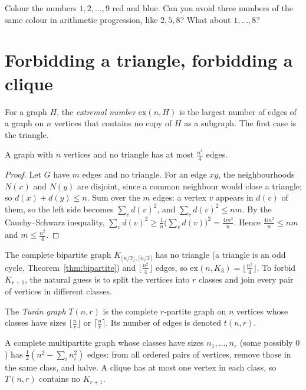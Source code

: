 \begin{think}
Colour the numbers $1,2,\dots,9$ red and blue. Can you avoid three numbers of the same colour in arithmetic progression, like $2,5,8$?
What about $1,\dots,8$?
\end{think}

\section{Forbidding a triangle, forbidding a clique}

For a graph $H$, the \emph{extremal number} $\mathrm{ex}(n,H)$ is the largest number of edges of a graph on $n$ vertices that contains no
copy of $H$ as a subgraph. The first case is the triangle.

\begin{theorem}[Mantel, 1907]\label{thm:mantel}
A graph with $n$ vertices and no triangle has at most $\frac{n^2}4$ edges.
\end{theorem}
\begin{proof}
Let $G$ have $m$ edges and no triangle. For an edge $xy$, the neighbourhoods $N(x)$ and $N(y)$ are disjoint, since a common neighbour would close a
triangle; so $d(x)+d(y)\le n$. Sum over the $m$ edges: a vertex $v$ appears in $d(v)$ of them, so the left side becomes $\sum_vd(v)^2$, and
$\sum_vd(v)^2\le nm$. By the Cauchy--Schwarz inequality, $\sum_vd(v)^2\ge\frac1n\bigl(\sum_vd(v)\bigr)^2=\frac{4m^2}n$. Hence $\frac{4m^2}n\le nm$ and
$m\le\frac{n^2}4$.
\end{proof}

The complete bipartite graph $K_{\lfloor n/2\rfloor,\lceil n/2\rceil}$ has no triangle (a triangle is an odd cycle, Theorem~\ref{thm:bipartite}) and
$\lfloor\frac{n^2}4\rfloor$ edges, so $\mathrm{ex}(n,K_3)=\lfloor\frac{n^2}4\rfloor$. To forbid $K_{r+1}$, the natural guess is to split the vertices into $r$
classes and join every pair of vertices in different classes.

\begin{definition}\label{def:turan}
The \emph{Tur\'an graph} $T(n,r)$ is the complete $r$-partite graph on $n$ vertices whose classes have sizes $\lfloor\frac nr\rfloor$ or
$\lceil\frac nr\rceil$. Its number of edges is denoted $t(n,r)$.
\end{definition}

A complete multipartite graph whose classes have sizes $n_1,\dots,n_r$ (some possibly $0$) has $\frac12(n^2-\sum_in_i^2)$ edges: from all ordered pairs of
vertices, remove those in the same class, and halve. A clique has at most one vertex in each class, so $T(n,r)$ contains no $K_{r+1}$.


